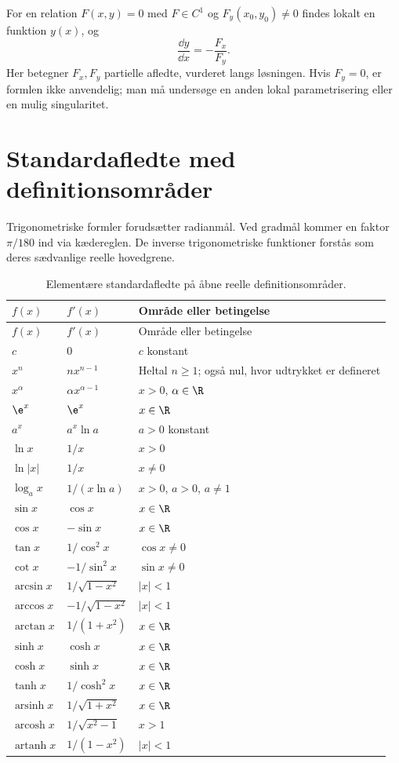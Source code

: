 For en relation $F(x,y)=0$ med $F\in C^1$ og $F_y(x_0,y_0)\ne0$ findes lokalt en funktion $y(x)$, og
\[
 \frac{\dd y}{\dd x}=-\frac{F_x}{F_y}.
\]
Her betegner $F_x,F_y$ partielle afledte, vurderet langs løsningen. Hvis $F_y=0$, er formlen ikke anvendelig; man må undersøge en anden lokal parametrisering eller en mulig singularitet.

\section{Standardafledte med definitionsområder}
\label{sec:standard}
Trigonometriske formler forudsætter radianmål. Ved gradmål kommer en faktor $\pi/180$ ind via kædereglen. De inverse trigonometriske funktioner forstås som deres sædvanlige reelle hovedgrene.

\begin{longtable}{@{}p{}p{}p{}@{}}
\caption{Elementære standardafledte på åbne reelle definitionsområder.}\\
\toprule $f(x)$ & $f'(x)$ & Område eller betingelse\\\midrule\endfirsthead
\toprule $f(x)$ & $f'(x)$ & Område eller betingelse\\\midrule\endhead
$c$ & $0$ & $c$ konstant\\[1mm]
$x^n$ & $nx^{n-1}$ & Heltal $n\ge1$; også nul, hvor udtrykket er defineret\\[1mm]
$x^\alpha$ & $\alpha x^{\alpha-1}$ & $x>0$, $\alpha\in\R$\\[1mm]
$\e^x$ & $\e^x$ & $x\in\R$\\[1mm]
$a^x$ & $a^x\ln a$ & $a>0$ konstant\\[1mm]
$\ln x$ & $1/x$ & $x>0$\\[1mm]
$\ln|x|$ & $1/x$ & $x\ne0$\\[1mm]
$\log_a x$ & $1/(x\ln a)$ & $x>0$, $a>0$, $a\ne1$\\[1mm]
$\sin x$ & $\cos x$ & $x\in\R$\\[1mm]
$\cos x$ & $-\sin x$ & $x\in\R$\\[1mm]
$\tan x$ & $1/\cos^2 x$ & $\cos x\ne0$\\[1mm]
$\cot x$ & $-1/\sin^2 x$ & $\sin x\ne0$\\[1mm]
$\arcsin x$ & $1/\sqrt{1-x^2}$ & $|x|<1$\\[1mm]
$\arccos x$ & $-1/\sqrt{1-x^2}$ & $|x|<1$\\[1mm]
$\arctan x$ & $1/(1+x^2)$ & $x\in\R$\\[1mm]
$\sinh x$ & $\cosh x$ & $x\in\R$\\[1mm]
$\cosh x$ & $\sinh x$ & $x\in\R$\\[1mm]
$\tanh x$ & $1/\cosh^2 x$ & $x\in\R$\\[1mm]
$\operatorname{arsinh}x$ & $1/\sqrt{1+x^2}$ & $x\in\R$\\[1mm]
$\operatorname{arcosh}x$ & $1/\sqrt{x^2-1}$ & $x>1$\\[1mm]
$\operatorname{artanh}x$ & $1/(1-x^2)$ & $|x|<1$\\
\bottomrule
\end{longtable}
